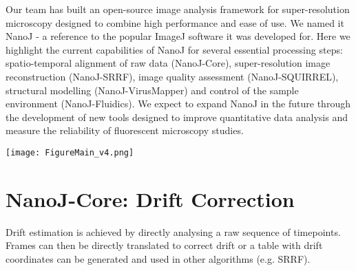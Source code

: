 \documentclass[a0,portrait]{a0poster}
\begin{document}

\begin{multicols}{3} %


\noindent
Our team has built an open-source image analysis framework for super-resolution microscopy designed to combine high performance and ease of use. We named it NanoJ - a reference to the popular ImageJ software it was developed for. Here we highlight the current capabilities of NanoJ for several essential processing steps: spatio-temporal alignment of raw data (NanoJ-Core), super-resolution image reconstruction (NanoJ-SRRF), image quality assessment (NanoJ-SQUIRREL), structural modelling (NanoJ-VirusMapper) and control of the sample environment (NanoJ-Fluidics). We expect to expand NanoJ in the future through the development of new tools designed to improve quantitative data analysis and measure the reliability of fluorescent microscopy studies.

\begin{center}\vspace{1cm}
\texttt{[image: FigureMain\_v4.png]}
\end{center}%

\section*{NanoJ-Core: Drift Correction}

\noindent
Drift estimation is achieved by directly analysing a raw sequence of timepoints. Frames can then be directly translated to correct drift or a table with drift coordinates can be generated and used in other algorithms (e.g. SRRF).


\end{multicols}
\end{document}
